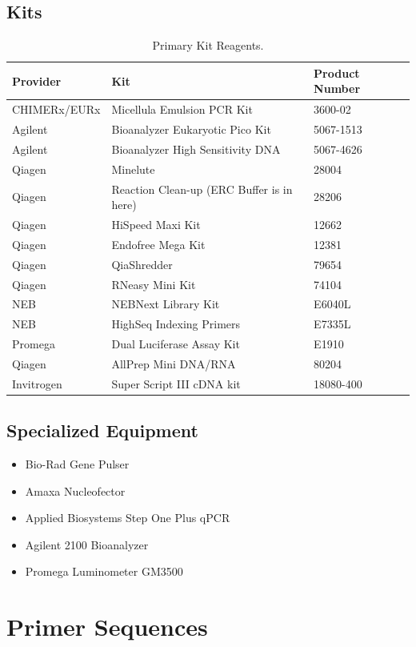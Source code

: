 \documentclass[a4paper]{article}
\begin{document}
    \subsection{Kits}
    	\FloatBarrier
            \begin{table}[H]
				\centering
				\begin{tabular}{l|l|l}
             Provider	&	Kit	&	Product Number	\\\hline
CHIMERx/EURx	&	Micellula Emulsion PCR Kit	&	3600-02\\
Agilent	&	Bioanalyzer Eukaryotic Pico Kit	&	5067-1513\\
Agilent	&	Bioanalyzer High Sensitivity DNA	&	5067-4626\\
Qiagen	&	Minelute	&	28004\\
Qiagen	&	Reaction Clean-up (ERC Buffer is in here)	&	28206\\
Qiagen	&	HiSpeed Maxi Kit	&	12662\\
Qiagen	&	Endofree Mega Kit	&	12381\\
Qiagen	&	QiaShredder	&	79654\\
Qiagen	&	RNeasy Mini Kit	&	74104\\
NEB	&	NEBNext Library Kit	&	E6040L\\
NEB	&	HighSeq Indexing Primers	&	E7335L\\
Promega	&	Dual Luciferase Assay Kit	&	E1910\\
Qiagen	&	AllPrep Mini DNA/RNA	&	80204\\
Invitrogen	&	Super Script III cDNA kit	&	18080-400\\
             
             \end{tabular}
           		\caption{\label{KReagents}Primary Kit Reagents.}
           \end{table}
    \subsection{Specialized Equipment}
    	\begin{itemize}
        	\item Bio-Rad Gene Pulser
    		\item Amaxa Nucleofector 
            \item Applied Biosystems Step One Plus qPCR
            \item Agilent 2100 Bioanalyzer
            \item Promega Luminometer GM3500
    	\end{itemize}
\section{Primer Sequences}
\end{document}
